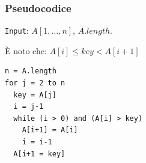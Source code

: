 \subsubsection{Pseudocodice}

\texttt{Input}: $A[1, \dots ,n]$, $A.length$.

\begin{center}
	È noto che: 
	$A[i] \leq key < A[i+1]$
\end{center}

\begin{lstlisting}
n = A.length
for j = 2 to n
  key = A[j]
  i = j-1
  while (i > 0) and (A[i] > key)	
    A[i+1] = A[i]
    i = i-1
  A[i+1 = key]
\end{lstlisting}